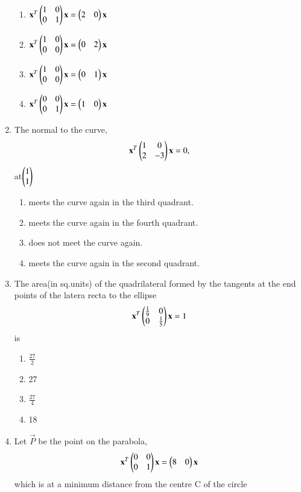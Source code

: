 \begin{enumerate}[label=\arabic*.,ref=\thesubsection.\theenumi]
    \begin{enumerate}
    \item $\mathbf{x}^T\begin{pmatrix}1&0\\0&1\end{pmatrix}\mathbf{x}=\begin{pmatrix}2&0\end{pmatrix}\mathbf{x}$
    \item $\mathbf{x}^T\begin{pmatrix}1&0\\0&0\end{pmatrix}\mathbf{x}=\begin{pmatrix}0&2\end{pmatrix}\mathbf{x}$
    \item $\mathbf{x}^T\begin{pmatrix}1&0\\0&0\end{pmatrix}\mathbf{x}=\begin{pmatrix}0&1\end{pmatrix}\mathbf{x}$
    \item $\mathbf{x}^T\begin{pmatrix}0&0\\0&1\end{pmatrix}\mathbf{x}=\begin{pmatrix}1&0\end{pmatrix}\mathbf{x}$
    \end{enumerate}
    \item The normal to the curve,
    \begin{align}
    \mathbf{x}^T\begin{pmatrix}1&0\\2&-3\end{pmatrix}\mathbf{x}=0,
    \end{align} at$\begin{pmatrix}1\\1\end{pmatrix}$
    \begin{enumerate}
    \item meets the curve again in the third quadrant.
    \item meets the curve again in the fourth quadrant.
    \item does not meet the curve again.
    \item meets the curve again in the second quadrant.
    \end{enumerate}
    \item The area(in sq.units) of the quadrilateral formed by the tangents at the end points of the latera recta to the ellipse 
    \begin{align}
    \mathbf{x}^T\begin{pmatrix}\frac{1}{9}&0\\0&\frac{1}{5}\end{pmatrix}\mathbf{x}=1
    \end{align} is 
    \begin{enumerate}
    \item $\frac{27}{2}$
    \item 27
    \item $\frac{27}{4}$
    \item 18
    \end{enumerate}
    \item Let $\vec{P}$ be the point on the parabola,
    \begin{align}
    \mathbf{x}^T\begin{pmatrix}0&0\\0&1\end{pmatrix}\mathbf{x}=\begin{pmatrix}8&0\end{pmatrix}\mathbf{x}
    \end{align} which is at a minimum distance from the centre C of the circle 

\end{enumerate}
